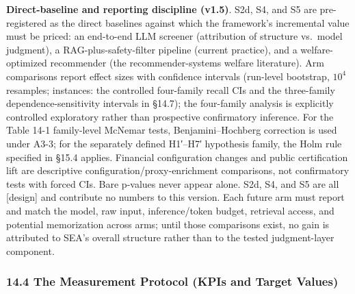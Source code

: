 \documentclass[
  11pt]{article}
\begin{document}
\textbf{Direct-baseline and reporting discipline (v1.5)}. S2d, S4, and
S5 are pre-registered as the direct baselines against which the
framework's incremental value must be priced: an end-to-end LLM screener
(attribution of structure vs.~model judgment), a RAG-plus-safety-filter
pipeline (current practice), and a welfare-optimized recommender (the
recommender-systems welfare literature). Arm comparisons report effect
sizes with confidence intervals (run-level bootstrap, \(10^4\)
resamples; instances: the controlled four-family recall CIs and the
three-family dependence-sensitivity intervals in §14.7); the four-family
analysis is explicitly controlled exploratory rather than prospective
confirmatory inference. For the Table 14-1 family-level McNemar tests,
Benjamini--Hochberg correction is used under A3-3; for the separately
defined H1′--H7′ hypothesis family, the Holm rule specified in §15.4
applies. Financial configuration changes and public certification lift
are descriptive configuration/proxy-enrichment comparisons, not
confirmatory tests with forced CIs. Bare p-values never appear alone.
S2d, S4, and S5 are all {[}design{]} and contribute no numbers to this
version. Each future arm must report and match the model, raw input,
inference/token budget, retrieval access, and potential memorization
across arms; until those comparisons exist, no gain is attributed to
SEA's overall structure rather than to the tested judgment-layer
component.

\subsubsection{14.4 The Measurement Protocol (KPIs and Target
Values)}\label{the-measurement-protocol-kpis-and-target-values}
\end{document}
